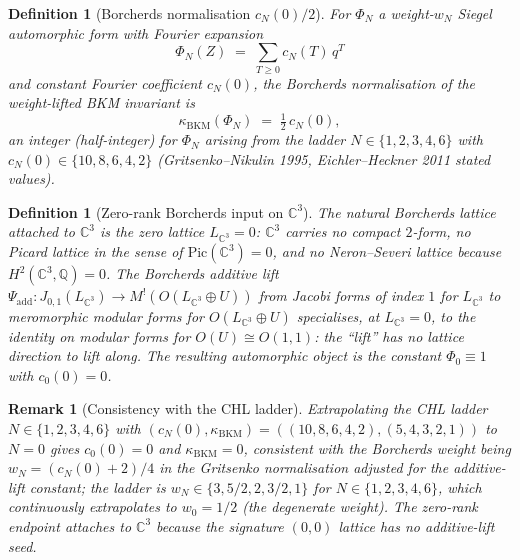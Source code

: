 \documentclass[11pt]{article}
\newtheorem{definition}[theorem]{Definition}
\newtheorem{remark}[theorem]{Remark}
\providecommand{\C}{\mathbb{C}}
\providecommand{\QQ}{\mathbb{Q}}
\providecommand{\kBKM}{\kappa_{\mathrm{BKM}}}
\begin{document}
\begin{definition}[Borcherds normalisation $c_N(0)/2$]
\label{def:bl1-borcherds-normalisation}
For $\Phi_N$ a weight-$w_N$ Siegel automorphic form with Fourier
expansion
\begin{equation}
  \Phi_N(Z) \;=\; \sum_{T \geq 0} c_N(T)\, q^T
\end{equation}
and constant Fourier coefficient $c_N(0)$, the
\emph{Borcherds normalisation} of the weight-lifted BKM invariant is
\begin{equation}
\label{eq:bl1-borcherds-norm}
  \kBKM(\Phi_N) \;=\; \tfrac{1}{2}\, c_N(0),
\end{equation}
an integer (half-integer) for $\Phi_N$ arising from the ladder
$N \in \{1, 2, 3, 4, 6\}$ with $c_N(0) \in \{10, 8, 6, 4, 2\}$
(Gritsenko--Nikulin 1995, Eichler--Heckner 2011 stated values).
\end{definition}

\begin{definition}[Zero-rank Borcherds input on $\C^3$]
\label{def:bl1-zero-rank-borcherds-c3}
The natural Borcherds lattice attached to $\C^3$ is the zero lattice
$L_{\C^3} = 0$: $\C^3$ carries no compact $2$-form, no Picard lattice
in the sense of $\mathrm{Pic}(\C^3) = 0$, and no Neron--Severi lattice
because $H^2(\C^3, \QQ) = 0$. The Borcherds additive lift
$\Psi_{\mathrm{add}} : J_{0,1}(L_{\C^3}) \to M^!(O(L_{\C^3} \oplus U))$
from Jacobi forms of index $1$ for $L_{\C^3}$ to meromorphic modular
forms for $O(L_{\C^3} \oplus U)$ specialises, at $L_{\C^3} = 0$, to the
identity on modular forms for $O(U) \cong O(1,1)$: the ``lift'' has no
lattice direction to lift along. The resulting automorphic object is
the constant $\Phi_0 \equiv 1$ with $c_0(0) = 0$.
\end{definition}

\begin{remark}[Consistency with the CHL ladder]
\label{rem:bl1-consistency-chl}
Extrapolating the CHL ladder $N \in \{1,2,3,4,6\}$ with
$(c_N(0), \kBKM) = ((10,8,6,4,2), (5,4,3,2,1))$ to $N = 0$ gives
$c_0(0) = 0$ and $\kBKM = 0$, consistent with the Borcherds weight being
$w_N = (c_N(0) + 2)/4$ in the Gritsenko normalisation adjusted for
the additive-lift constant; the ladder is $w_N \in \{3, 5/2, 2, 3/2, 1\}$
for $N \in \{1,2,3,4,6\}$, which continuously extrapolates to $w_0 = 1/2$
(the degenerate weight). The zero-rank endpoint attaches to $\C^3$
because the signature $(0, 0)$ lattice has no additive-lift seed.
\end{remark}
\end{document}
